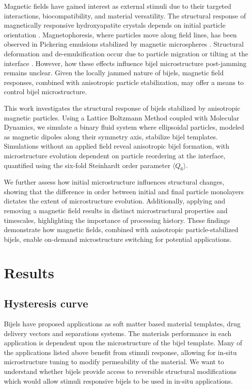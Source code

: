 Magnetic fields have gained interest as external stimuli due to their targeted interactions, biocompatibility, and material 
versatility. The structural response of magnetically responsive hydroxyapatite crystals depends on initial particle orientation
\cite{nakayama_stimuli-responsive_2018}. Magnetophoresis, where particles move along field lines, has been observed in Pickering 
emulsions stabilized by magnetic microspheres \cite{tham_magnetophoresis_2021}. Structural deformation and de-emulsification occur due 
to particle migration or tilting at the interface \cite{yang_rapid_2020, misra_magnetic_2020}. However, how these effects influence 
bijel microstructure post-jamming remains unclear. Given the locally jammed nature of bijels, magnetic field responses, combined with 
anisotropic particle stabilization, may offer a means to control bijel microstructure.

This work investigates the structural response of bijels stabilized by anisotropic magnetic particles. Using a Lattice Boltzmann Method 
coupled with Molecular Dynamics, we simulate a binary fluid system where ellipsoidal particles, modeled as magnetic dipoles along their 
symmetry axis, stabilize bijel templates. Simulations without an applied field reveal anisotropic bijel formation, with microstructure 
evolution dependent on particle reordering at the interface, quantified using the six-fold Steinhardt order parameter \(\langle Q_6 \rangle\).

We further assess how initial microstructure influences structural changes, showing that the difference in order between initial and final 
particle monolayers dictates the extent of microstructure evolution. Additionally, applying and removing a magnetic field results in distinct 
microstructural properties and timescales, highlighting the importance of processing history. These findings demonstrate how magnetic fields, 
combined with anisotropic particle-stabilized bijels, enable on-demand microstructure switching for potential applications.

\section{Results}\label{sec:results_p2}
\subsection{Hysteresis curve}\label{section:hysteresis_curve}

Bijels have proposed applications as soft matter based material templates, drug delivery vectors and separations systems. The materials 
performance in each application is dependent upon the microstructure of the bijel template. Many of the applications listed above benefit 
from stimuli response, allowing for in-situ microstructure tuning to modify permeability of the material. We want to understand whether 
bijels provide access to reversible structural modifications which would allow stimuli responsive bijels to be used in in-situ applications.

